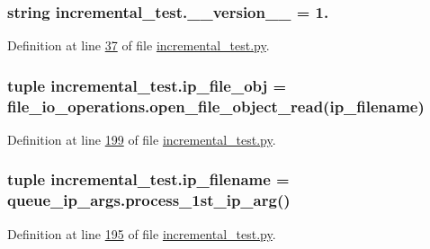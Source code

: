 \subsubsection[{\+\_\+\+\_\+version\+\_\+\+\_\+}]{\setlength{\rightskip}{0pt plus 5cm}string incremental\+\_\+test.\+\_\+\+\_\+version\+\_\+\+\_\+ = \textquotesingle{}1.\textquotesingle{}}\label{namespaceincremental__test_a0f94dd1f320b9558e27a5809d2041c4c}


Definition at line \hyperlink{incremental__test_8py_source_l00037}{37} of file \hyperlink{incremental__test_8py_source}{incremental\+\_\+test.\+py}.

\hypertarget{namespaceincremental__test_aaf431f9a2a2d1172f09263453438e4f4}{}
\subsubsection[{ip\+\_\+file\+\_\+obj}]{\setlength{\rightskip}{0pt plus 5cm}tuple incremental\+\_\+test.\+ip\+\_\+file\+\_\+obj = {\bf file\+\_\+io\+\_\+operations.\+open\+\_\+file\+\_\+object\+\_\+read}({\bf ip\+\_\+filename})}\label{namespaceincremental__test_aaf431f9a2a2d1172f09263453438e4f4}


Definition at line \hyperlink{incremental__test_8py_source_l00199}{199} of file \hyperlink{incremental__test_8py_source}{incremental\+\_\+test.\+py}.

\hypertarget{namespaceincremental__test_ab5a7aa877c2dae060e3fd03a472cbbf3}{}
\subsubsection[{ip\+\_\+filename}]{\setlength{\rightskip}{0pt plus 5cm}tuple incremental\+\_\+test.\+ip\+\_\+filename = {\bf queue\+\_\+ip\+\_\+args.\+process\+\_\+1st\+\_\+ip\+\_\+arg}()}\label{namespaceincremental__test_ab5a7aa877c2dae060e3fd03a472cbbf3}


Definition at line \hyperlink{incremental__test_8py_source_l00195}{195} of file \hyperlink{incremental__test_8py_source}{incremental\+\_\+test.\+py}.

